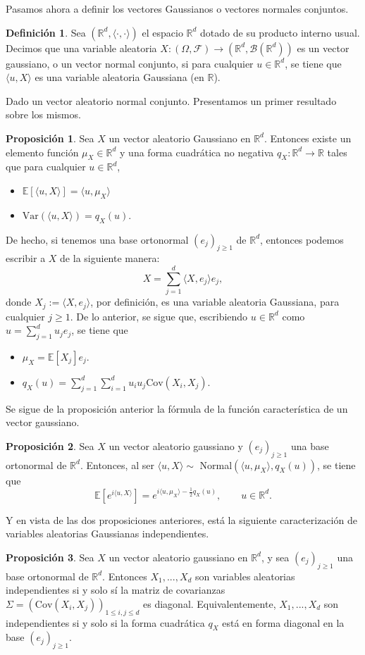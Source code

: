 \documentclass[letterpaper,twoside,12pt]{book}
\newcommand{\R}{\mathbb{R}}
\newcommand{\F}{\mathcal{F}}
\newcommand{\B}{\mathcal{B}}
\newcommand{\E}{\mathbb{E}}
\newcommand{\1}{\mathds{1}}
\renewcommand{\to}{\rightarrow}
\theoremstyle{definition}
\newtheorem{dfn}{Definición}
\theoremstyle{definition}
\theoremstyle{definition}
\theoremstyle{definition}
\newtheorem{prop}{Proposición}
\theoremstyle{definition}
\theoremstyle{definition}
\theoremstyle{definition}
\begin{document}
 Pasamos ahora a definir los vectores Gaussianos o vectores normales conjuntos. 
 \begin{dfn} 
  Sea $(\R^d, \langle\cdot,\cdot\rangle)$ el espacio $\R^{d}$ dotado de su producto interno usual. Decimos que una variable aleatoria $X:(\Omega,\F)\to (\R^{d},\B(\R^d))$ es un vector gaussiano, o un vector normal conjunto, si para cualquier $u\in \R^d$, se tiene que $\langle u,X\rangle$ es una variable aleatoria Gaussiana (en $\R$).
  \end{dfn}
Dado un vector aleatorio normal conjunto. Presentamos un primer resultado sobre los mismos.
\begin{prop} 
Sea $X$ un vector aleatorio Gaussiano en $\R^{d}$. Entonces existe un elemento función $\mu_X\in\R^d$ y una forma cuadrática no negativa $q_X:\R^d\to \R$ tales que para cualquier $u\in \R^d$,
\begin{itemize}
    \item $\E\left[\langle u,X\rangle\right]=\langle u,\mu_X\rangle$
    \item $\text{Var}\left(\langle u,X\rangle\right)=q_X(u)$.
\end{itemize}
De hecho, si tenemos una base ortonormal $(e_{j})_{j\geq1}$ de $\R^{d}$, entonces podemos escribir a $X$ de la siguiente manera:
\[
X=\sum_{j=1}^{d}\langle X,e_j\rangle e_j,  
\]
donde $X_j:=\langle X,e_j\rangle$, por definición, es una variable aleatoria Gaussiana, para cualquier $j\geq1$. De lo anterior, se sigue que, escribiendo $u\in \R^d$ como $u=\sum_{j=1}^{d}u_je_j$, se tiene que 
\begin{itemize}
    \item $\mu_X=\E\left[X_j\right]e_j$.
    \item $q_X(u)=\sum_{j=1}^{d}\sum_{i=1}^{d}u_iu_j \text{Cov}\left(X_i,X_j\right)$.
\end{itemize}
 \end{prop}

Se sigue de la proposición anterior la fórmula de la función característica de un vector gaussiano.
\begin{prop} 
 Sea $X$ un vector aleatorio gaussiano y $(e_j)_{j\geq1}$ una base ortonormal de $\R^{d}$. Entonces, al ser $\langle u,X\rangle\sim$ Normal$(\langle u,\mu_X\rangle,q_X(u))$, se tiene que %
 \[
 \E\left[e^{i\langle u,X\rangle}\right]=e^{i \langle u,\mu_X\rangle-\frac{1}{2}q_X(u)}, \qquad u\in \R^d.
 \]
 \end{prop}
Y en vista de las dos proposiciones anteriores, está la siguiente caracterización de variables aleatorias Gaussianas independientes.
\begin{prop} 
 Sea $X$ un vector aleatorio gaussiano en $\R^{d}$, y sea $(e_j)_{j\geq1}$ una base ortonormal de $\R^{d}$. Entonces $X_1,...,X_d$ son variables aleatorias independientes si y solo sí la matriz de covarianzas $\Sigma=(\text{Cov}\left(X_i,X_j\right))_{1\leq i,j\leq d}$ es diagonal. Equivalentemente, $X_1,...,X_d$ son independientes si y solo si la forma cuadrática $q_X$ está en forma diagonal en la base $(e_j)_{j\geq1}$.
 \end{prop}
\end{document}
